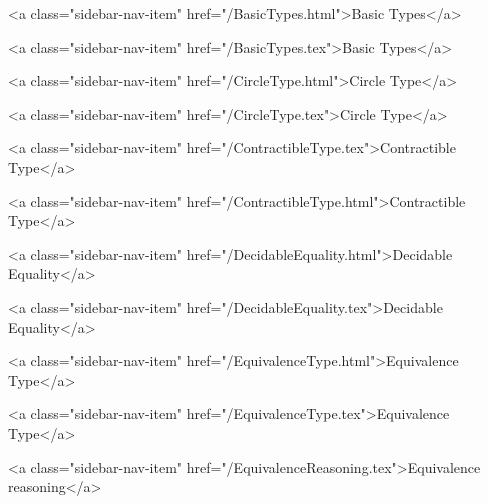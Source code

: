           <a class="sidebar-nav-item" href="/BasicTypes.html">Basic Types</a>
        
      
    
      
        
          <a class="sidebar-nav-item" href="/BasicTypes.tex">Basic Types</a>
        
      
    
      
        
          <a class="sidebar-nav-item" href="/CircleType.html">Circle Type</a>
        
      
    
      
        
          <a class="sidebar-nav-item" href="/CircleType.tex">Circle Type</a>
        
      
    
      
        
          <a class="sidebar-nav-item" href="/ContractibleType.tex">Contractible Type</a>
        
      
    
      
        
          <a class="sidebar-nav-item" href="/ContractibleType.html">Contractible Type</a>
        
      
    
      
        
          <a class="sidebar-nav-item" href="/DecidableEquality.html">Decidable Equality</a>
        
      
    
      
        
          <a class="sidebar-nav-item" href="/DecidableEquality.tex">Decidable Equality</a>
        
      
    
      
        
          <a class="sidebar-nav-item" href="/EquivalenceType.html">Equivalence Type</a>
        
      
    
      
        
          <a class="sidebar-nav-item" href="/EquivalenceType.tex">Equivalence Type</a>
        
      
    
      
        
          <a class="sidebar-nav-item" href="/EquivalenceReasoning.tex">Equivalence reasoning</a>
        
      
    
